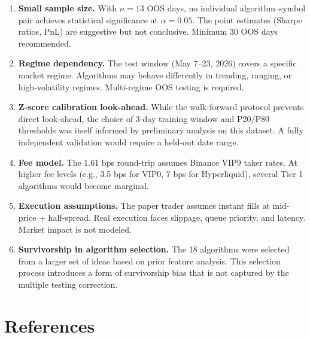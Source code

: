 \documentclass[11pt,a4paper]{article}
\begin{document}
\begin{enumerate}
    \item \textbf{Small sample size.} With $n = 13$ OOS days, no individual algorithm--symbol pair achieves statistical significance at $\alpha = 0.05$. The point estimates (Sharpe ratios, PnL) are suggestive but not conclusive. Minimum 30 OOS days recommended.

    \item \textbf{Regime dependency.} The test window (May 7--23, 2026) covers a specific market regime. Algorithms may behave differently in trending, ranging, or high-volatility regimes. Multi-regime OOS testing is required.

    \item \textbf{Z-score calibration look-ahead.} While the walk-forward protocol prevents direct look-ahead, the choice of 3-day training window and P20/P80 thresholds was itself informed by preliminary analysis on this dataset. A fully independent validation would require a held-out date range.

    \item \textbf{Fee model.} The 1.61 bps round-trip assumes Binance VIP9 taker rates. At higher fee levels (e.g., 3.5 bps for VIP0, 7 bps for Hyperliquid), several Tier 1 algorithms would become marginal.

    \item \textbf{Execution assumptions.} The paper trader assumes instant fills at mid-price + half-spread. Real execution faces slippage, queue priority, and latency. Market impact is not modeled.

    \item \textbf{Survivorship in algorithm selection.} The 18 algorithms were selected from a larger set of ideas based on prior feature analysis. This selection process introduces a form of survivorship bias that is not captured by the multiple testing correction.
\end{enumerate}

\section*{References}
\end{document}
